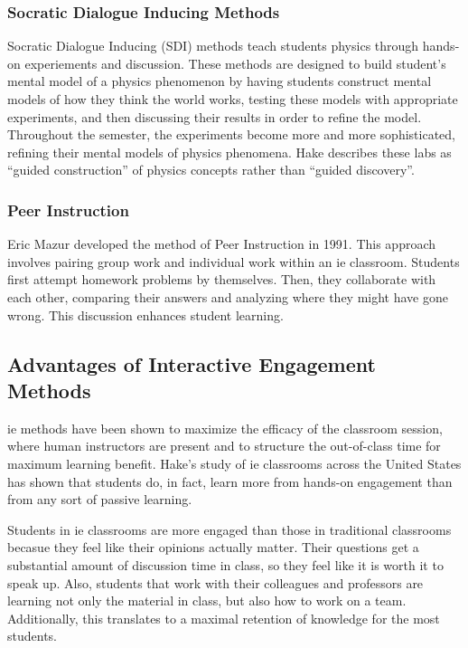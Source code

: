 \subsubsection{Socratic Dialogue Inducing Methods}

Socratic Dialogue Inducing (SDI) methods teach students physics through hands-on experiements and discussion. These methods are designed to build student's mental model of a physics phenomenon by having students construct mental models of how they think the world works, testing these models with appropriate experiments, and then discussing their results in order to refine the model. Throughout the semester, the experiments become more and more sophisticated, refining their mental models of physics phenomena. Hake describes these labs as ``guided construction'' of physics concepts rather than ``guided discovery''\cite{hake1992}.

\subsubsection{Peer Instruction}

Eric Mazur developed the method of Peer Instruction in 1991. This approach involves pairing group work and individual work within an \gls{ie} classroom. Students first attempt homework problems by themselves. Then, they collaborate with each other, comparing their answers and analyzing where they might have gone wrong. This discussion enhances student learning\cite{mazur1997}.

\subsection{Advantages of Interactive Engagement Methods}

\gls{ie} methods have been shown to maximize the efficacy of the classroom session, where human instructors are present and to structure the out-of-class time for maximum learning benefit. Hake's study of \gls{ie} classrooms across the United States has shown that students do, in fact, learn more from hands-on engagement than from any sort of passive learning\cite{hake1998}.

Students in \gls{ie} classrooms are more engaged than those in traditional classrooms becasue they feel like their opinions actually matter. Their questions get a substantial amount of discussion time in class, so they feel like it is worth it to speak up. Also, students that work with their colleagues and professors are learning not only the material in class, but also how to work on a team. Additionally, this translates to a maximal retention of knowledge for the most students\cite{novak1999}.

